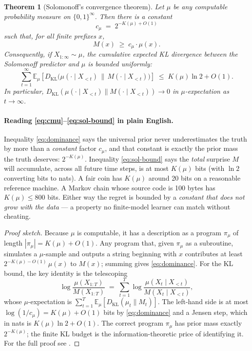 \documentclass[12pt,a4paper]{article}
\theoremstyle{plain}
\newtheorem{theorem}{Theorem}[section]
\theoremstyle{definition}
\begin{document}
\begin{theorem}[Solomonoff's convergence theorem]
\label{thm:solomonoff}
Let $\mu$ be any computable probability measure on $\{0,1\}^\infty$.
Then there is a constant
\begin{equation}
  c_\mu \;=\; 2^{-K(\mu) + O(1)}
  \label{eq:cmu}
\end{equation}
such that, for all finite prefixes $x$,
\begin{equation}
  M(x) \;\ge\; c_\mu \cdot \mu(x).
  \label{eq:dominance}
\end{equation}
Consequently, if $X_{1:\infty} \sim \mu$, the cumulative expected
KL divergence between the Solomonoff predictor and $\mu$ is bounded
uniformly:
\begin{equation}
  \sum_{t=1}^{\infty}
    \mathbb{E}_{\mu}\!\left[
      D_{\mathrm{KL}}\!\bigl(\mu(\cdot \mid X_{<t}) \,\|\, M(\cdot \mid X_{<t})\bigr)
    \right]
  \;\le\; K(\mu)\ln 2 + O(1).
  \label{eq:sol-bound}
\end{equation}
In particular,
$D_{\mathrm{KL}}(\mu(\cdot \mid X_{<t}) \| M(\cdot \mid X_{<t})) \to 0$
in $\mu$-expectation as $t \to \infty$.
\end{theorem}

\paragraph{Reading \eqref{eq:cmu}--\eqref{eq:sol-bound} in plain
English.}  Inequality \eqref{eq:dominance} says the universal prior
never underestimates the truth by more than a \emph{constant} factor
$c_\mu$, and that constant is exactly the prior mass the truth
deserves: $2^{-K(\mu)}$.  Inequality \eqref{eq:sol-bound} says the
\emph{total} surprise $M$ will accumulate, across all future time
steps, is at most $K(\mu)$ bits (with $\ln 2$ converting bits to
nats).  A fair coin has $K(\mu)$ around 20 bits on a reasonable
reference machine.  A Markov chain whose source code is 100 bytes
has $K(\mu) \le 800$ bits.  Either way the regret is bounded by a
\emph{constant that does not grow with the data} --- a property no
finite-model learner can match without cheating.

\begin{proof}[Proof sketch]
Because $\mu$ is computable, it has a description as a program
$\pi_\mu$ of length $|\pi_\mu| = K(\mu) + O(1)$.  Any program that,
given $\pi_\mu$ as a subroutine, simulates a $\mu$-sample and outputs
a string beginning with $x$ contributes at least
$2^{-K(\mu)-O(1)}\,\mu(x)$ to $M(x)$; summing gives
\eqref{eq:dominance}.  For the KL bound, the key identity is the
telescoping
\[
  \log \frac{\mu(X_{1:T})}{M(X_{1:T})}
  \;=\; \sum_{t=1}^{T}
    \log \frac{\mu(X_t \mid X_{<t})}{M(X_t \mid X_{<t})},
\]
whose $\mu$-expectation is
$\sum_{t=1}^T \mathbb{E}_\mu [D_{\mathrm{KL}}(\mu_t \| M_t)]$.  The
left-hand side is at most $\log(1/c_\mu) = K(\mu) + O(1)$ bits by
\eqref{eq:dominance} and a Jensen step, which in nats is
$K(\mu)\ln 2 + O(1)$.  The correct program $\pi_\mu$ has prior mass
exactly $2^{-K(\mu)}$; the finite KL budget is the
information-theoretic price of identifying it.  For the full proof
see \citet[Ch.~5]{livitanyi2019}.
\end{proof}
\end{document}

